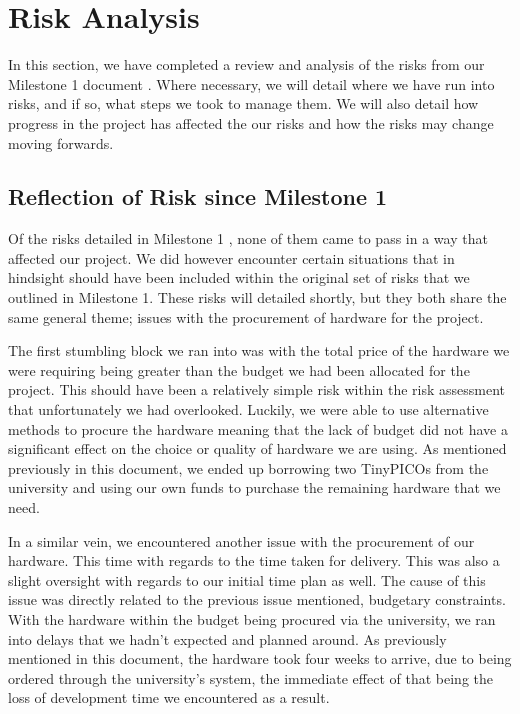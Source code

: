 \chapter{Risk Analysis} \label{ch:Requirements}

In this section, we have completed a review and analysis of the risks from our Milestone 1 document \cite{coaker}. Where necessary, we will detail where we have run into risks, and if so, what steps we took to manage them. We will also detail how progress in the project has affected the our risks and how the risks may change moving forwards.

\section{Reflection of Risk since Milestone 1}
Of the risks detailed in Milestone 1 \cite{coaker}, none of them came to pass in a way that affected our project. We did however encounter certain situations that in hindsight should have been included within the original set of risks that we outlined in Milestone 1. These risks will detailed shortly, but they both share the same general theme; issues with the procurement of hardware for the project. 

The first stumbling block we ran into was with the total price of the hardware we were requiring being greater than the budget we had been allocated for the project. This should have been a relatively simple risk within the risk assessment that unfortunately we had overlooked. Luckily, we were able to use alternative methods to procure the hardware meaning that the lack of budget did not have a significant effect on the choice or quality of hardware we are using. As mentioned previously in this document, we ended up borrowing two TinyPICOs from the university and using our own funds to purchase the remaining hardware that we need. 

In a similar vein, we encountered another issue with the procurement of our hardware. This time with regards to the time taken for delivery. This was also a slight oversight with regards to our initial time plan as well. The cause of this issue was directly related to the previous issue mentioned, budgetary constraints. With the hardware within the budget being procured via the university, we ran into delays that we hadn't expected and planned around. As previously mentioned in this document, the hardware took four weeks to arrive, due to being ordered through the university's system, the immediate effect of that being the loss of development time we encountered as a result. 

